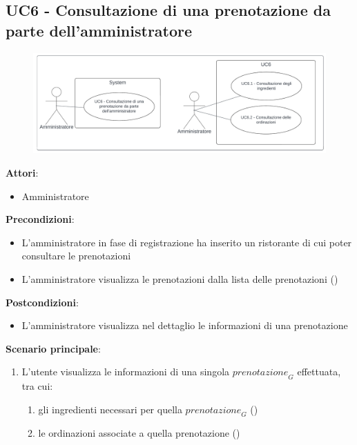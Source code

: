 \subsection{UC6 - Consultazione di una prenotazione da parte dell'amministratore}\label{usecase:6}
\begin{figure}[H]
  \centering
  \includegraphics[width=1\textwidth]{ucd/UCD6_new.png}
\end{figure}
\textbf{Attori}:
\begin{itemize}
    \item Amministratore
\end{itemize}
\textbf{Precondizioni}:
\begin{itemize}
    \item L'amministratore in fase di registrazione ha inserito un ristorante di cui poter consultare le prenotazioni
    \item L'amministratore visualizza le prenotazioni dalla lista delle prenotazioni ()
\end{itemize}
\textbf{Postcondizioni}:
\begin{itemize}
    \item L'amministratore visualizza nel dettaglio le informazioni di una prenotazione
\end{itemize}
\textbf{Scenario principale}:
\begin{enumerate}
    \item L'utente visualizza le informazioni di una singola $\textit{prenotazione}_G$ effettuata, tra cui:
    \begin{enumerate}
        \item gli ingredienti necessari per quella $\textit{prenotazione}_G$ ()
        \item le ordinazioni associate a quella prenotazione
        ()
    \end{enumerate}
\end{enumerate}